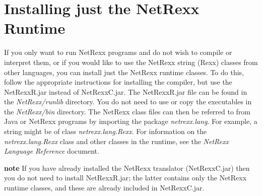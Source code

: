 \section{Installing just the NetRexx Runtime}
If you only want to run NetRexx programs and do not wish to compile or
interpret them, or if you would like to use the NetRexx string (Rexx)
classes from other languages, you can install just the NetRexx runtime
classes.
\newline
To do this, follow the appropriate instructions for installing the
compiler, but use the NetRexxR.jar instead of NetRexxC.jar.
The NetRexxR.jar file can be found in the \emph{NetRexx/runlib} directory.
\newline
You do not need to use or copy the executables in the \emph{NetRexx/bin}
directory.
\newline
The NetRexx class files can then be referred to from Java or NetRexx
programs by importing the package \emph{netrexx.lang}.  For
example, a string might be of class \emph{netrexx.lang.Rexx}.
\newline
For information on the \emph{netrexx.lang.Rexx} class and other classes
in the runtime, see the \emph{NetRexx Language Reference} document.

\textbf{note} If you have already installed the NetRexx translator
(NetRexxC.jar) then you do not need to install NetRexxR.jar; the latter
contains only the NetRexx runtime classes, and these are already
included in NetRexxC.jar.

